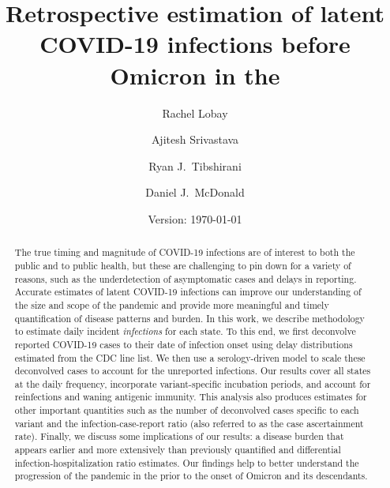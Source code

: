 \documentclass{article}
\begin{document}
\title{Retrospective estimation of latent COVID-19 infections before Omicron in the \US}
\author[a,1]{Rachel Lobay}
\author[b]{Ajitesh Srivastava}
\author[c]{Ryan J.\ Tibshirani}
\author[a]{Daniel J.\ McDonald}





\date{Version: \today}
\maketitle

\begin{abstract}
The true timing and magnitude of COVID-19 infections are of interest to both the
public and to public health, but these are challenging to pin down for a variety
of reasons, such as the underdetection of asymptomatic cases and delays in
reporting. Accurate estimates of latent COVID-19 infections can improve our
understanding of the size and scope of the pandemic and provide more meaningful
and timely quantification of disease patterns and burden. In this work, we
describe methodology to estimate daily incident \emph{infections} for each \US
state. To this end, we first deconvolve reported COVID-19 cases to their date of
infection onset using delay distributions estimated from the CDC line list. We
then use a serology-driven model to scale these deconvolved cases to account for
the unreported infections. Our results cover all states at the daily frequency,
incorporate variant-specific incubation periods, and account for reinfections
and waning antigenic immunity. This analysis also produces estimates for other
important quantities such as the number of deconvolved cases specific to each
variant and the infection-case-report ratio (also referred to as the case
ascertainment rate). Finally, we discuss some implications of our results: a
disease burden that appears earlier and more extensively than previously
quantified and differential infection-hospitalization ratio estimates. Our
findings help to better understand the progression of the pandemic in the \US
prior to the onset of Omicron and its descendants. 

\end{abstract}
\end{document}

